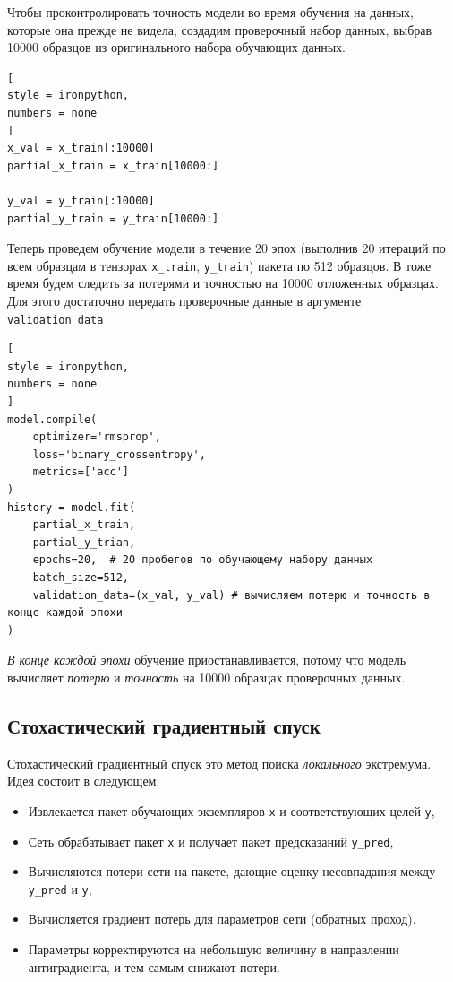 \documentclass[%
	11pt,
	a4paper,
	utf8,
		]{article}
\begin{document}
Чтобы проконтролировать точность модели во время обучения на данных, которые она прежде не видела, создадим проверочный набор данных, выбрав 10000 образцов из оригинального набора обучающих данных.
\begin{lstlisting}[
style = ironpython,
numbers = none
]
x_val = x_train[:10000]
partial_x_train = x_train[10000:]

y_val = y_train[:10000]
partial_y_train = y_train[10000:]
\end{lstlisting}

Теперь  проведем обучение модели в течение 20 эпох (выполнив 20 итераций по всем образцам в тензорах \texttt{x\_train}, \texttt{y\_train}) пакета по 512 образцов. В тоже время будем следить за потерями и точностью на 10000 отложенных образцах. Для этого достаточно передать проверочные данные в аргументе \texttt{validation\_data}
\begin{lstlisting}[
style = ironpython,
numbers = none
]
model.compile(
    optimizer='rmsprop',
    loss='binary_crossentropy',
    metrics=['acc']
)
history = model.fit(
    partial_x_train,
    partial_y_trian,
    epochs=20,  # 20 пробегов по обучающему набору данных
    batch_size=512,
    validation_data=(x_val, y_val) # вычисляем потерю и точность в конце каждой эпохи
)
\end{lstlisting}

\emph{В конце каждой эпохи} обучение приостанавливается, потому что модель вычисляет \emph{потерю} и \emph{точность} на 10000 образцах проверочных данных.

\subsection{Стохастический градиентный спуск}

Стохастический градиентный спуск это метод поиска \emph{локального} экстремума. Идея состоит в следующем:
\begin{itemize}
	\item Извлекается пакет обучающих экземпляров \texttt{x} и соответствующих целей \texttt{y},
	
	\item Сеть обрабатывает пакет \texttt{x} и получает пакет предсказаний \texttt{y\_pred},
	
	\item Вычисляются потери сети на пакете, дающие оценку несовпадания между \texttt{y\_pred} и \texttt{y},
	
	\item Вычисляется градиент потерь для параметров сети (обратных проход),
	
	\item Параметры корректируются на небольшую величину в направлении антиградиента, и тем самым снижают потери.
\end{itemize}
\end{document}
